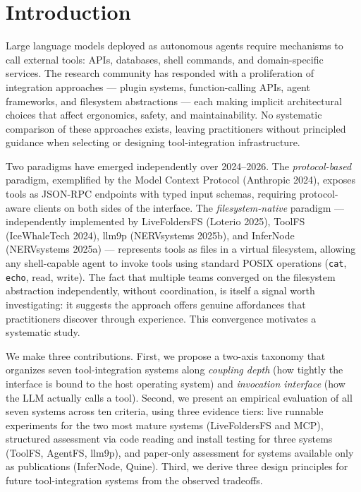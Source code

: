 \documentclass[
  11pt,
]{article}
\begin{document}
\hypertarget{introduction}{%
\section{Introduction}\label{introduction}}

Large language models deployed as autonomous agents require mechanisms
to call external tools: APIs, databases, shell commands, and
domain-specific services. The research community has responded with a
proliferation of integration approaches --- plugin systems,
function-calling APIs, agent frameworks, and filesystem abstractions ---
each making implicit architectural choices that affect ergonomics,
safety, and maintainability. No systematic comparison of these
approaches exists, leaving practitioners without principled guidance
when selecting or designing tool-integration infrastructure.

Two paradigms have emerged independently over 2024--2026. The
\emph{protocol-based} paradigm, exemplified by the Model Context
Protocol (Anthropic 2024), exposes tools as JSON-RPC endpoints with
typed input schemas, requiring protocol-aware clients on both sides of
the interface. The \emph{filesystem-native} paradigm --- independently
implemented by LiveFoldersFS (Loterio 2025), ToolFS (IceWhaleTech 2024),
llm9p (NERVsystems 2025b), and InferNode (NERVsystems 2025a) ---
represents tools as files in a virtual filesystem, allowing any
shell-capable agent to invoke tools using standard POSIX operations
(\texttt{cat}, \texttt{echo}, read, write). The fact that multiple teams
converged on the filesystem abstraction independently, without
coordination, is itself a signal worth investigating: it suggests the
approach offers genuine affordances that practitioners discover through
experience. This convergence motivates a systematic study.

We make three contributions. First, we propose a two-axis taxonomy that
organizes seven tool-integration systems along \emph{coupling depth}
(how tightly the interface is bound to the host operating system) and
\emph{invocation interface} (how the LLM actually calls a tool). Second,
we present an empirical evaluation of all seven systems across ten
criteria, using three evidence tiers: live runnable experiments for the
two most mature systems (LiveFoldersFS and MCP), structured assessment
via code reading and install testing for three systems (ToolFS, AgentFS,
llm9p), and paper-only assessment for systems available only as
publications (InferNode, Quine). Third, we derive three design
principles for future tool-integration systems from the observed
tradeoffs.
\end{document}
